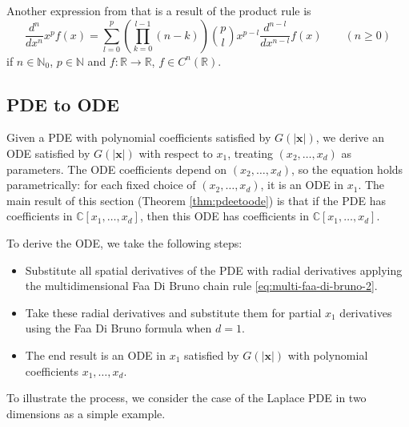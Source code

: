 \documentclass[12pt]{article}
\def\C{{\mathbb C}}
\def\N{{\mathbb N}}
\def\R{{\mathbb R}}
\let\b=\boldsymbol
\theoremstyle{definition}
\theoremstyle{plain}
\theoremstyle{definition}
\begin{document}
Another expression from \cite{functions.wolfram.com} that is a result of the product rule is
\begin{equation}
\label{eq:productrule1}
\frac{d^n}{dx^n}  x^p f(x) = \sum_{l=0}^p \left(\prod^{l-1}_{k=0}(n-k)\right) \binom{p}{l} x^{p-l} \frac{d^{n-l}}{dx^{n-l}} f(x)\qquad (n \geq 0)
\end{equation}
 if $n \in \N_{0}$, $p \in \N$ and $f: \R \to \R$, $f \in C^n(\R)$.
\subsection{PDE to ODE}
\label{sec:pde-to-ode}
Given a PDE with polynomial coefficients satisfied by $G(|\b{x}|)$, we derive an ODE satisfied by $G(|\b{x}|)$ with respect to $x_1$, treating $(x_2, \dots, x_d)$ as parameters. The ODE coefficients depend on $(x_2, \dots, x_d)$, so the equation holds parametrically: for each fixed choice of $(x_2, \dots, x_d)$, it is an ODE in $x_1$. The main result of this section (Theorem \ref{thm:pdeetoode}) is that if the PDE has coefficients in $\C[x_1, \dots, x_d]$, then this ODE has coefficients in $\C[x_1, \dots, x_d]$. 

To derive the ODE, we take the following steps:
\begin{itemize}
\item Substitute all spatial derivatives of the PDE with radial derivatives applying the multidimensional Faa Di Bruno chain rule \eqref{eq:multi-faa-di-bruno-2}.
\item Take these radial derivatives and substitute them for partial $x_1$ derivatives using the Faa Di Bruno formula when $d=1$.
\item The end result is an ODE in $x_1$ satisfied by $G(|\b{x}|)$ with polynomial coefficients $x_1, \dots, x_d$. 
\end{itemize}

To illustrate the process, we consider the case of the Laplace PDE in two dimensions as a simple example.
\end{document}
